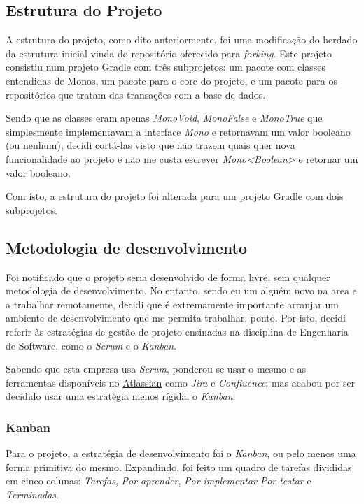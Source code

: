 \subsection{Estrutura do Projeto}

A estrutura do projeto, como dito anteriormente, foi uma modificação do herdado da estrutura inicial vinda do repositório oferecido para \textit{forking}. Este projeto consistiu num projeto Gradle com três subprojetos: um pacote com classes entendidas de Monos, um pacote para o core do projeto, e um pacote para os repositórios que tratam das transações com a base de dados.

Sendo que as classes eram apenas \textit{MonoVoid}, \textit{MonoFalse} e \textit{MonoTrue} que simplesmente implementavam a interface \textit{Mono} e retornavam um valor booleano (ou nenhum), decidi cortá-las visto que não trazem quais quer nova funcionalidade ao projeto e não me custa escrever \textit{Mono<Boolean>} e retornar um valor booleano.

Com isto, a estrutura do projeto foi alterada para um projeto Gradle com dois subprojetos.

\subsection{Metodologia de desenvolvimento}

Foi notificado que o projeto seria desenvolvido de forma livre, sem qualquer metodologia de desenvolvimento. No entanto, sendo eu um alguém novo na area e a trabalhar remotamente, decidi que é extremamente importante arranjar um ambiente de desenvolvimento que me permita trabalhar, ponto. Por isto, decidi referir às estratégias de gestão de projeto ensinadas na disciplina de Engenharia de Software, como o \textit{Scrum} e o \textit{Kanban}.

Sabendo que esta empresa usa \textit{Scrum}, ponderou-se usar o mesmo e as ferramentas disponíveis no \href{https://www.atlassian.com/}{Atlassian} como \textit{Jira} e \textit{Confluence}; mas acabou por ser decidido usar uma estratégia menos rígida, o \textit{Kanban}.

\subsubsection{Kanban}

Para o projeto, a estratégia de desenvolvimento foi o \textit{Kanban}, ou pelo menos uma forma primitiva do mesmo. Expandindo, foi feito um quadro de tarefas divididas em cinco colunas: \textit{Tarefas}, \textit{Por aprender}, \textit{Por implementar} \textit{Por testar} e \textit{Terminadas}.


